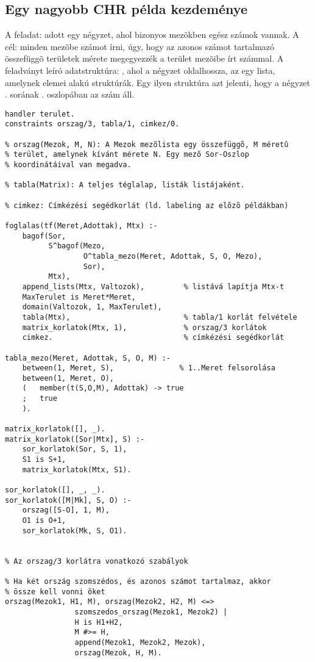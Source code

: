 \subsection{Egy nagyobb CHR példa kezdeménye}

A feladat: adott egy négyzet, ahol bizonyos mezõkben egész számok vannak.
A cél: minden mezõbe számot írni, úgy, hogy az azonos számot tartalmazó
összefüggõ területek mérete megegyezzék a terület mezõibe írt számmal. 
\br
A feladványt leíró adatstruktúra: , ahol 
a négyzet oldalhossza, az  egy lista, amelynek elemei 
 alakú struktúrák. Egy ilyen struktúra azt jelenti, hogy a
négyzet . sorának . oszlopában az  szám áll.

\begin{verbatim}
handler terulet.
constraints orszag/3, tabla/1, cimkez/0.

% orszag(Mezok, M, N): A Mezok mezõlista egy összefüggõ, M méretû
% terület, amelynek kívánt mérete N. Egy mezõ Sor-Oszlop
% koordinátáival van megadva.

% tabla(Matrix): A teljes téglalap, listák listájaként.

% cimkez: Címkézési segédkorlát (ld. labeling az elõzõ példákban)

foglalas(tf(Meret,Adottak), Mtx) :-
    bagof(Sor,
          S^bagof(Mezo, 
                  O^tabla_mezo(Meret, Adottak, S, O, Mezo), 
                  Sor),
          Mtx),
    append_lists(Mtx, Valtozok),         % listává lapítja Mtx-t
    MaxTerulet is Meret*Meret,
    domain(Valtozok, 1, MaxTerulet),
    tabla(Mtx),                          % tabla/1 korlát felvétele
    matrix_korlatok(Mtx, 1),             % orszag/3 korlátok
    cimkez.                              % címkézési segédkorlát

tabla_mezo(Meret, Adottak, S, O, M) :-
    between(1, Meret, S),               % 1..Meret felsorolása
    between(1, Meret, O),
    (   member(t(S,O,M), Adottak) -> true
    ;   true
    ).

matrix_korlatok([], _).
matrix_korlatok([Sor|Mtx], S) :-
    sor_korlatok(Sor, S, 1),
    S1 is S+1,
    matrix_korlatok(Mtx, S1).

sor_korlatok([], _, _).
sor_korlatok([M|Mk], S, O) :-
    orszag([S-O], 1, M),
    O1 is O+1,
    sor_korlatok(Mk, S, O1).


% Az orszag/3 korlátra vonatkozó szabályok

% Ha két ország szomszédos, és azonos számot tartalmaz, akkor
% össze kell vonni õket
orszag(Mezok1, H1, M), orszag(Mezok2, H2, M) <=>
                szomszedos_orszag(Mezok1, Mezok2) |
                H is H1+H2,
                M #>= H,
                append(Mezok1, Mezok2, Mezok),
                orszag(Mezok, H, M).


\end{verbatim}
